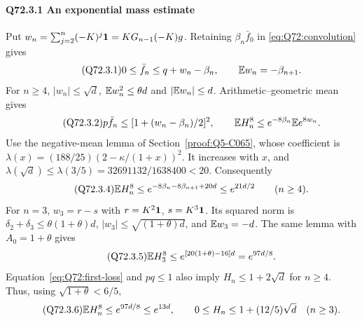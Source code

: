 \paragraph{Q72.3.1 An exponential mass estimate}\label{part:Q72.3.1}
Put $w_n=\allowbreak \sum_{j=\allowbreak 2}^n(-K)^j\mathbf1=\allowbreak KG_{n-1}(-K)g$.
Retaining $\beta_n\bar f_0$ in \eqref{eq:Q72:convolution} gives
\begin{equation}\tag{Q72.3.1}\label{eq:Q72:first-loss}
 0\le\bar f_n\le q+w_n-\beta_n,\qquad \mathbb E w_n=-\beta_{n+1}.
\end{equation}
For $n\ge\allowbreak 4$, $|w_n|\le\allowbreak \sqrt d$, $\mathbb E w_n^2\le\allowbreak \theta d$ and
$|\mathbb E w_n|\le\allowbreak  d$. Arithmetic--geometric mean gives
\begin{equation}\tag{Q72.3.2}\label{eq:Q72:mass-exp}
 p\bar f_n\le[1+(w_n-\beta_n)/2]^2,\qquad
 \mathbb E H_n^8\le e^{-8\beta_n}\mathbb E e^{8w_n}.
\end{equation}
Use the negative-mean lemma of Section~\ref{proof:Q5-C065}, whose
coefficient is $\lambda(x)=\allowbreak (188/25)(2-\kappa/(1+x))^2$.
It increases with $x$, and
$\lambda(\sqrt d)\le\allowbreak \lambda(3/5)=\allowbreak 32691132/1638400<\allowbreak 20$.
Consequently
\begin{equation}\tag{Q72.3.4}\label{eq:Q72:mass-long-exp}
 \mathbb E H_n^8\le e^{-8\beta_n-8\beta_{n+1}+20d}\le e^{21d/2}
 \qquad(n\ge4).
\end{equation}
For $n=\allowbreak 3$, $w_3=\allowbreak r-s$ with $r=\allowbreak K^2\mathbf1$, $s=\allowbreak K^3\mathbf1$.
Its squared norm is $\delta_2+\delta_3\le\allowbreak \theta(1+\theta)d$,
$|w_3|\le\allowbreak \sqrt{(1+\theta)d}$, and $\mathbb E w_3=\allowbreak -d$.
The same lemma with $A_0=\allowbreak 1+\theta$ gives
\begin{equation}\tag{Q72.3.5}\label{eq:Q72:mass-three-exp}
 \mathbb E H_3^8\le e^{[20(1+\theta)-16]d}=e^{97d/8}.
\end{equation}
Equation~\eqref{eq:Q72:first-loss} and $pq\le\allowbreak 1$ also imply
$H_n\le\allowbreak 1+2\sqrt d$ for $n\ge\allowbreak 4$. Thus, using $\sqrt{1+\theta}<\allowbreak 6/5$,
\begin{equation}\tag{Q72.3.6}\label{eq:Q72:rough-mass}
 \mathbb E H_n^8\le e^{97d/8}\le e^{13d},\qquad
 0\le H_n\le1+(12/5)\sqrt d\quad(n\ge3).
\end{equation}

